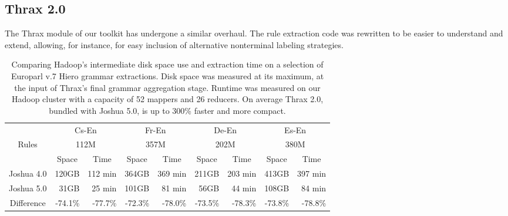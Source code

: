 \documentclass[11pt]{article}
\begin{document}
\subsection{Thrax 2.0}
\label{sec:thrax}

The Thrax module of our toolkit has undergone a similar overhaul. The
rule extraction code was rewritten to be easier to understand and
extend, allowing, for instance, for easy inclusion of alternative
nonterminal labeling strategies.

\begin{table}[t]
  \begin{center}
    \begin{tabular}{|c|r|r|r|r|r|r|r|r|}
      \hline
      & \multicolumn{2}{c|}{Cs-En} & \multicolumn{2}{c|}{Fr-En} &
      \multicolumn{2}{c|}{De-En} & \multicolumn{2}{c|}{Es-En} \\

      Rules & \multicolumn{2}{c|}{112M} & \multicolumn{2}{c|}{357M} &
      \multicolumn{2}{c|}{202M} & \multicolumn{2}{c|}{380M} \\

      \hline

      & \multicolumn{1}{c|}{Space} & \multicolumn{1}{c|}{Time} &
      \multicolumn{1}{c|}{Space} & \multicolumn{1}{c|}{Time}  &
      \multicolumn{1}{c|}{Space} & \multicolumn{1}{c|}{Time}  &
      \multicolumn{1}{c|}{Space} &  \multicolumn{1}{c|}{Time} \\
      \hline
      \hline
      Joshua 4.0 & 120GB & 112 min & 364GB & 369 min & 211GB & 203 min & 413GB & 397 min \\
      \hline
      Joshua 5.0 & 31GB  & 25 min & 101GB  & 81 min & 56GB  & 44 min & 108GB & 84 min \\
      \hline
      \hline
      Difference & -74.1\% & -77.7\%  & -72.3\% & -78.0\%  & -73.5\% & -78.3\%  & -73.8\% & -78.8\% \\
      \hline
    \end{tabular}
  \end{center}
  \caption{Comparing Hadoop's intermediate disk space use and
    extraction time on a selection of Europarl v.7 Hiero grammar
    extractions. Disk space was measured at its maximum, at
    the input of Thrax's final grammar aggregation stage. Runtime was
    measured on our Hadoop cluster with a capacity of 52 mappers and
    26 reducers. On average Thrax 2.0, bundled with Joshua 5.0,
    is up to 300\% faster and more compact.}
  \label{tab-thrax-speed}
\end{table}
\end{document}

